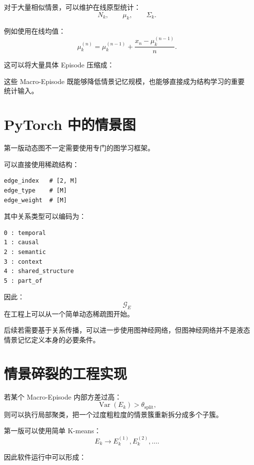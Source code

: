 对于大量相似情景，可以维护在线原型统计：
\[
N_k,
\qquad
\mu_k,
\qquad
\Sigma_k.
\]

例如使用在线均值：
\[
\mu_k^{(n)}
=
\mu_k^{(n-1)}
+
\frac{
x_n-\mu_k^{(n-1)}
}{
n
}.
\]

这可以将大量具体 Episode 压缩成：
\begin{statementbox}
\centering
{}
\end{statementbox}

这些 Macro-Episode 既能够降低情景记忆规模，也能够直接成为结构学习的重要统计输入。

\section{PyTorch 中的情景图}

第一版动态图不一定需要使用专门的图学习框架。

可以直接使用稀疏结构：

\begin{verbatim}
edge_index   # [2, M]
edge_type    # [M]
edge_weight  # [M]
\end{verbatim}

其中关系类型可以编码为：

\begin{verbatim}
0 : temporal
1 : causal
2 : semantic
3 : context
4 : shared_structure
5 : part_of
\end{verbatim}

因此：
\[
\mathcal{G}_E
\]
在工程上可以从一个简单动态稀疏图开始。

后续若需要基于关系传播，可以进一步使用图神经网络，但图神经网络并不是液态情景记忆定义本身的必要条件。

\section{情景碎裂的工程实现}

若某个 Macro-Episode 内部方差过高：
\[
\operatorname{Var}(E_k)
>
\theta_{\mathrm{split}},
\]
则可以执行局部聚类，把一个过度粗粒度的情景簇重新拆分成多个子簇。

第一版可以使用简单 K-means：
\[
E_k
\rightarrow
E_k^{(1)},
E_k^{(2)},
\ldots.
\]

因此软件运行中可以形成：
\begin{statementbox}
\centering
{}
\end{statementbox}

